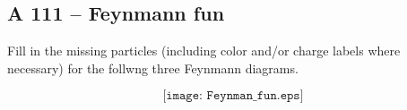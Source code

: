 \subsection*{A 111 -- Feynmann fun}

Fill in the missing particles (including color and/or charge labels
where necessary) for the follwng three Feynmann diagrams.


\[ \texttt{[image: Feynman\_fun.eps]} \]

